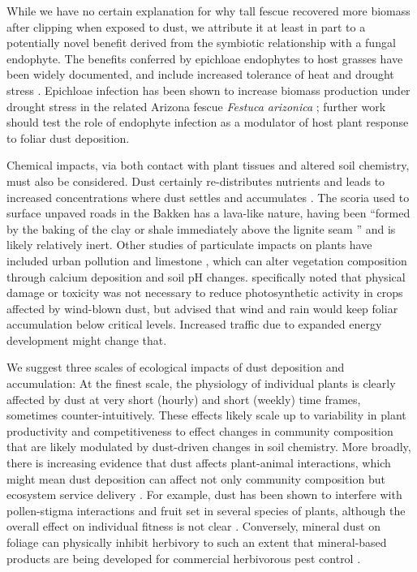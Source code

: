 \documentclass{svjour3}
\begin{document}
While we have no certain explanation for why tall fescue recovered more biomass after clipping when exposed to dust, we attribute it at least in part to a potentially novel benefit derived from the symbiotic relationship with a fungal endophyte. 
The benefits conferred by epichloae endophytes to host grasses have been widely documented, and include increased tolerance of heat and drought stress \cite{gibert2012,he2013}. 
Epichloae infection has been shown to increase biomass production under drought stress in the related Arizona fescue \emph{Festuca arizonica} \citep{morse2002}; further work should test the role of endophyte infection as a modulator of host plant response to foliar dust deposition. 

Chemical impacts, via both contact with plant tissues and altered soil chemistry, must also be considered. 
Dust certainly re-distributes nutrients and leads to increased concentrations where dust settles and accumulates \citep{brahney2014, lawrence2010}. 
The scoria used to surface unpaved roads in the Bakken has a lava-like nature, having been ``formed by the baking of the clay or shale immediately above the lignite seam \citep[][p.435]{roe1950}'' and is likely relatively inert. 
Other studies of particulate impacts on plants have included urban pollution \citep{bao2015} and limestone \citep{brown2009, organiscak2004}, which can alter vegetation composition through calcium deposition and soil pH changes. 
\citet{armbrust1986} specifically noted that physical damage or toxicity was not necessary to reduce photosynthetic activity in crops affected by wind-blown dust, but advised that wind and rain would keep foliar accumulation below critical levels. 
Increased traffic due to expanded energy development might change that.

We suggest three scales of ecological impacts of dust deposition and accumulation: At the finest scale, the physiology of individual plants is clearly affected by dust at very short (hourly) and short (weekly) time frames, sometimes counter-intuitively. 
These effects likely scale up to variability in plant productivity and competitiveness to effect changes in community composition that are likely modulated by dust-driven changes in soil chemistry. 
More broadly, there is increasing evidence that dust affects plant-animal interactions, which might mean dust deposition can affect not only community composition but ecosystem service delivery \citep{zheng2020}. 
For example, dust has been shown to interfere with pollen-stigma interactions and fruit set in several species of plants, although the overall effect on individual fitness is not clear \citep{waser2017, zhang2019}. 
Conversely, mineral dust on foliage can physically inhibit herbivory to such an extent that mineral-based products are being developed for commercial herbivorous pest control \citep{faraone2020}. 
\end{document}
